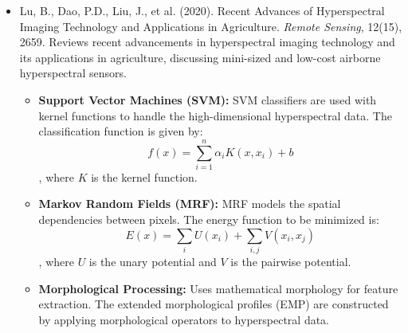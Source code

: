 \documentclass[10pt,svgnames,fragile]{beamer}
\begin{document}
\begin{frame}
\tiny
\begin{itemize}

    \item Lu, B., Dao, P.D., Liu, J., et al. (2020). Recent Advances of Hyperspectral Imaging Technology and Applications in Agriculture. \textit{Remote Sensing}, 12(15), 2659. \href{https://www.mdpi.com/2072-4292/12/15/2659}{\color{blue}{DOI: 10.3390/rs12152659}}
    {\color{gray}Reviews recent advancements in hyperspectral imaging technology and its applications in agriculture, discussing mini-sized and low-cost airborne hyperspectral sensors.}
    \begin{itemize} \tiny
    \item \textbf{Support Vector Machines (SVM):} SVM classifiers are used with kernel functions to handle the high-dimensional hyperspectral data. The classification function is given by: \[ f(x) = \sum_{i=1}^{n} \alpha_i K(x, x_i) + b \], where \( K \) is the kernel function.
    \item \textbf{Markov Random Fields (MRF):} MRF models the spatial dependencies between pixels. The energy function to be minimized is: \[ E(x) = \sum_{i} U(x_i) + \sum_{i,j} V(x_i, x_j) \], where \( U \) is the unary potential and \( V \) is the pairwise potential.
    \item \textbf{Morphological Processing:} Uses mathematical morphology for feature extraction. The extended morphological profiles (EMP) are constructed by applying morphological operators to hyperspectral data.
\end{itemize}

\end{itemize}
\end{frame}
\end{document}
